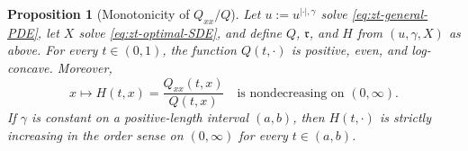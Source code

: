 \documentclass[10pt]{amsart}
\newtheorem{proposition}[proposition]{Proposition}
\theoremstyle{definition}
\theoremstyle{remark}
\numberwithin{equation}{section}
\newcommand{\1}{\mathbf 1}
\begin{document}
\begin{proposition}[Monotonicity of $Q_{xx}/Q$]
\label{prop:zt-H-monotonicity}
Let $u:=u^{|\cdot|,\gamma}$ solve \eqref{eq:zt-general-PDE}, let $X$ solve \eqref{eq:zt-optimal-SDE}, and define $Q$, $\mathfrak r$, and $H$ from $(u,\gamma,X)$ as above. For every $t\in(0,1)$, the function $Q(t,\cdot)$ is positive, even, and log-concave. Moreover,
\begin{equation}
 x\longmapsto H(t,x)=\frac{Q_{xx}(t,x)}{Q(t,x)}
 \quad\text{is nondecreasing on }(0,\infty).
 \label{eq:zt-H-monotone}
\end{equation}
If $\gamma$ is constant on a positive-length interval $(a,b)$, then $H(t,\cdot)$ is strictly increasing in the order sense on $(0,\infty)$ for every $t\in(a,b)$.
\end{proposition}
\end{document}
